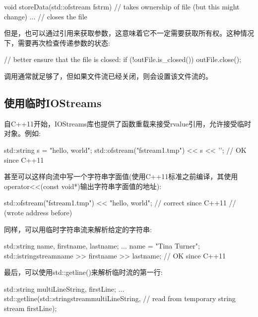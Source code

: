 \begin{cppcode}
void storeData(std::ofstream fstrm) // takes ownership of file (but this might change)
{
	...
} // closes the file
\end{cppcode}

但是，也可以通过引用来获取参数，这意味着它不一定需要获取所有权。这种情况下，需要再次检查传递参数的状态:

\begin{cppcode}
// better ensure that the file is closed:
if (!outFile.is_closed()) {
	outFile.close();
}
\end{cppcode}

调用通常就足够了，但如果文件流已经关闭，则会设置该文件流的。

\subsection{使用临时IOStreams}

自C++11开始，IOStreams库也提供了函数重载来接受rvalue引用，允许接受临时对象。例如:

\begin{cppcode}
std::string s = "hello, world";
std::ofstream("fstream1.tmp") << s << '\n'; // OK since C++11
\end{cppcode}

甚至可以这样向流中写一个字符串字面值(使用C++11标准之前编译，其使用operator<<(const void*)输出字符串字面值的地址):

\begin{cppcode}
std::ofstream("fstream1.tmp") << "hello, world\n"; // correct since C++11
// (wrote address before)
\end{cppcode}

同样，可以用临时字符串流来解析给定的字符串:

\begin{cppcode}
std::string name, firstname, lastname;
...
name = "Tina Turner";
std::istringstream{name} >> firstname >> lastname; // OK since C++11
\end{cppcode}

最后，可以使用std::getline()来解析临时流的第一行:

\begin{cppcode}
std::string multiLineString, firstLine;
...
std::getline(std::stringstream{multiLineString}, // read from temporary string stream
firstLine);
\end{cppcode}



























